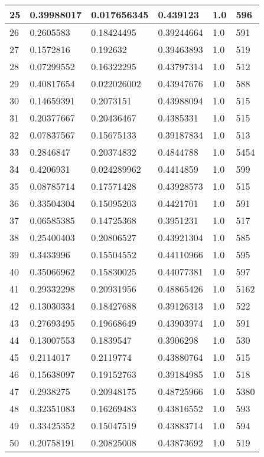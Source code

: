 \begin{longtable}{|l|l|l|l|l|l|}
25 & 0.39988017 & 0.017656345 & 0.439123 & 1.0 & 596 \\ \hline 
26 & 0.2605583 & 0.18424495 & 0.39244664 & 1.0 & 591 \\ \hline 
27 & 0.1572816 & 0.192632 & 0.39463893 & 1.0 & 519 \\ \hline 
28 & 0.07299552 & 0.16322295 & 0.43797314 & 1.0 & 512 \\ \hline 
29 & 0.40817654 & 0.022026002 & 0.43947676 & 1.0 & 588 \\ \hline 
30 & 0.14659391 & 0.2073151 & 0.43988094 & 1.0 & 515 \\ \hline 
31 & 0.20377667 & 0.20436467 & 0.4385331 & 1.0 & 515 \\ \hline 
32 & 0.07837567 & 0.15675133 & 0.39187834 & 1.0 & 513 \\ \hline 
33 & 0.2846847 & 0.20374832 & 0.4844788 & 1.0 & 5454 \\ \hline 
34 & 0.4206931 & 0.024289962 & 0.4414859 & 1.0 & 599 \\ \hline 
35 & 0.08785714 & 0.17571428 & 0.43928573 & 1.0 & 515 \\ \hline 
36 & 0.33504304 & 0.15095203 & 0.4421701 & 1.0 & 591 \\ \hline 
37 & 0.06585385 & 0.14725368 & 0.3951231 & 1.0 & 517 \\ \hline 
38 & 0.25400403 & 0.20806527 & 0.43921304 & 1.0 & 585 \\ \hline 
39 & 0.3433996 & 0.15504552 & 0.44110966 & 1.0 & 595 \\ \hline 
40 & 0.35066962 & 0.15830025 & 0.44077381 & 1.0 & 597 \\ \hline 
41 & 0.29332298 & 0.20931956 & 0.48865426 & 1.0 & 5162 \\ \hline 
42 & 0.13030334 & 0.18427688 & 0.39126313 & 1.0 & 522 \\ \hline 
43 & 0.27693495 & 0.19668649 & 0.43903974 & 1.0 & 591 \\ \hline 
44 & 0.13007553 & 0.1839547 & 0.3906298 & 1.0 & 530 \\ \hline 
45 & 0.2114017 & 0.2119774 & 0.43880764 & 1.0 & 515 \\ \hline 
46 & 0.15638097 & 0.19152763 & 0.39184985 & 1.0 & 518 \\ \hline 
47 & 0.2938275 & 0.20948175 & 0.48725966 & 1.0 & 5380 \\ \hline 
48 & 0.32351083 & 0.16269483 & 0.43816552 & 1.0 & 593 \\ \hline 
49 & 0.33425352 & 0.15047519 & 0.43883714 & 1.0 & 594 \\ \hline 
50 & 0.20758191 & 0.20825008 & 0.43873692 & 1.0 & 519 \\ \hline 
\end{longtable}